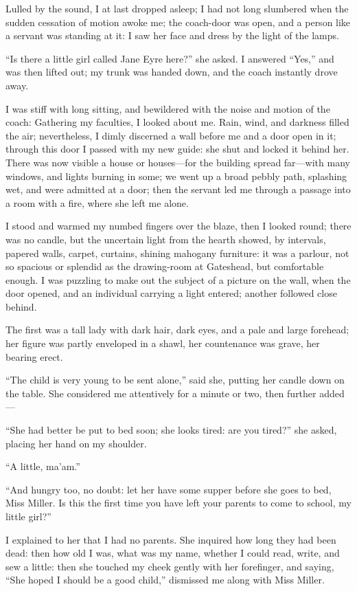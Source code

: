 Lulled by the sound, I at last dropped asleep; I had not long slumbered
when the sudden cessation of motion awoke me; the coach-door was open,
and a person like a servant was standing at it: I saw her face and dress
by the light of the lamps.

\enquote{Is there a little girl called Jane Eyre here?} she asked. I
answered \enquote{Yes,} and was then lifted out; my trunk was handed
down, and the coach instantly drove away.

I was stiff with long sitting, and bewildered with the noise and motion
of the coach: Gathering my faculties, I looked about me. Rain, wind,
and darkness filled the air; nevertheless, I dimly discerned a wall
before me and a door open in it; through this door I passed with my new
guide: she shut and locked it behind her. There was now visible a house
or houses---for the building spread far---with many windows, and lights
burning in some; we went up a broad pebbly path, splashing wet, and were
admitted at a door; then the servant led me through a passage into a
room with a fire, where she left me alone.

I stood and warmed my numbed fingers over the blaze, then I looked
round; there was no candle, but the uncertain light from the hearth
showed, by intervals, papered walls, carpet, curtains, shining mahogany
furniture: it was a parlour, not so spacious or splendid as the
drawing-room at Gateshead, but comfortable enough. I was puzzling to
make out the subject of a picture on the wall, when the door opened, and
an individual carrying a light entered; another followed close behind.

The first was a tall lady with dark hair, dark eyes, and a pale and
large forehead; her figure was partly enveloped in a shawl, her
countenance was grave, her bearing erect.

\enquote{The child is very young to be sent alone,} said she, putting
her candle down on the table. She considered me attentively for a
minute or two, then further added---

\enquote{She had better be put to bed soon; she looks tired: are you
tired?} she asked, placing her hand on my shoulder.

\enquote{A little, ma'am.}

\enquote{And hungry too, no doubt: let her have some supper before she
goes to bed, Miss Miller. Is this the first time you have left your
parents to come to school, my little girl?}

I explained to her that I had no parents. She inquired how long they
had been dead: then how old I was, what was my name, whether I could
read, write, and sew a little: then she touched my cheek gently with her
forefinger, and saying, \enquote{She hoped I should be a good child,}
dismissed me along with Miss Miller.

